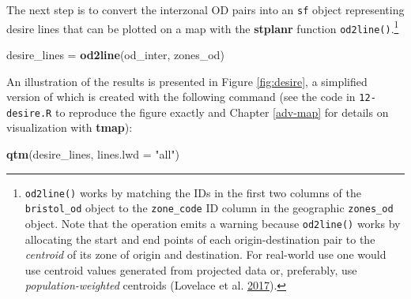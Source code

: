 \documentclass[]{krantz}
\newenvironment{Shaded}{\begin{snugshade}}{\end{snugshade}}
\newcommand{\DataTypeTok}[1]{\textcolor[rgb]{0.27,0.27,0.27}{#1}}
\newcommand{\KeywordTok}[1]{\textcolor[rgb]{0.27,0.27,0.27}{\textbf{#1}}}
\newcommand{\NormalTok}[1]{#1}
\newcommand{\StringTok}[1]{\textcolor[rgb]{0.5,0.5,0.5}{#1}}
\let\rmarkdownfootnote\footnote%
\def\footnote{\protect\rmarkdownfootnote}
\begin{document}
The next step is to convert the interzonal OD pairs into an \texttt{sf} object representing desire lines that can be plotted on a map with the \textbf{stplanr} function \texttt{od2line()}.\footnote{\texttt{od2line()} works by matching the IDs in the first two columns of the \texttt{bristol\_od} object to the \texttt{zone\_code} ID column in the geographic \texttt{zones\_od} object.
  Note that the operation emits a warning because \texttt{od2line()} works by allocating the start and end points of each origin-destination pair to the \emph{centroid} of its zone of origin and destination.
  For real-world use one would use centroid values generated from projected data or, preferably, use \emph{population-weighted} centroids (Lovelace et al. \protect\hyperlink{ref-lovelace_propensity_2017}{2017}).}

\begin{Shaded}
\begin{Highlighting}[]
\NormalTok{desire_lines =}\StringTok{ }\KeywordTok{od2line}\NormalTok{(od_inter, zones_od)}
\end{Highlighting}
\end{Shaded}

An illustration of the results is presented in Figure \ref{fig:desire}, a simplified version of which is created with the following command (see the code in \texttt{12-desire.R} to reproduce the figure exactly and Chapter \ref{adv-map} for details on visualization with \textbf{tmap}):

\begin{Shaded}
\begin{Highlighting}[]
\KeywordTok{qtm}\NormalTok{(desire_lines, }\DataTypeTok{lines.lwd =} \StringTok{"all"}\NormalTok{)}
\end{Highlighting}
\end{Shaded}
\end{document}
